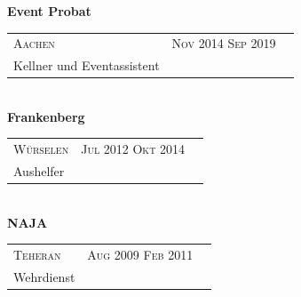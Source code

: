 \documentclass[onside]{article}
\makeatletter
\newcommand{\jobevent}[5]{%
    \begin{tabularx}{\linewidth}{@{}l@{\hspace{#5}}Xr@{}}%
    {\scshape\fontseries{light}\selectfont\footnotesize \scalebox{1.144}{\faMapMarker}{} #1} & {\scshape\fontseries{light}\selectfont\footnotesize \faCalendar{} #2 \textendash{} #3} \\
    {#4} \\[1ex]%
    \end{tabularx}%
}
\makeatother
\begin{document}
{\begin{minipage}[t][\dimexpr\textheight-2\fboxrule-2\fboxsep\relax][t]{\dimexpr0.6\textwidth-2\fboxrule-2\fboxsep\relax}
        \begin{justify}
        \setlength{\parindent}{0pt}
        \faBuilding{} {\normalsize \textbf{Event Probat}} \\[1ex]
        \jobevent{Aachen}{Nov 2014}{Sep 2019}{Kellner und Eventassistent}{3.425cm} \\
        \faIndustry{} {\normalsize \textbf{Frankenberg}} \\[1ex]
        \jobevent{Würselen}{Jul 2012}{Okt 2014}{Aushelfer}{6.4cm} \\
        \faGopuram{} {\normalsize \textbf{NAJA}} \\[1ex]
        \jobevent{Teheran}{Aug 2009}{Feb 2011}{Wehrdienst}{6.cm} \\
        \vspace{+2pt}
        \end{justify}

%
%
%



\end{minipage}}
\end{document}
